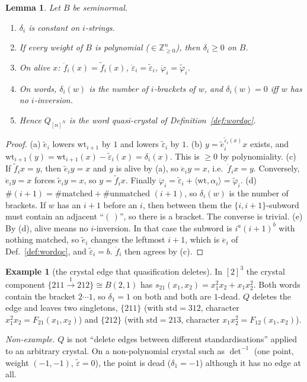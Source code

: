 \documentclass[11pt]{amsart}
\newtheorem{lemma}[theorem]{Lemma}
\theoremstyle{definition}
\newtheorem{example}[theorem]{Example}
\theoremstyle{remark}
\newcommand{\ee}{\ddot e}
\newcommand{\ff}{\ddot f}
\newcommand{\eps}{\ddot\varepsilon}
\newcommand{\vphi}{\ddot\varphi}
\newcommand{\te}{\tilde e}
\newcommand{\tf}{\tilde f}
\newcommand{\teps}{\tilde\varepsilon}
\newcommand{\tphi}{\tilde\varphi}
\newcommand{\wt}{\mathrm{wt}}
\newcommand{\std}{\mathrm{std}}
\begin{document}
\begin{lemma}\label{lem:defect}
Let $B$ be seminormal.
\begin{enumerate}[label=(\alph*)]
\item $\delta_i$ is constant on $i$-strings.
\item If every weight of $B$ is polynomial ($\in\mathbb Z_{\ge0}^n$), then $\delta_i\ge0$ on $B$.
\item On alive $x$: $\ff_i(x)=\tf_i(x)$, $\eps_i=\teps_i$, $\vphi_i=\tphi_i$.
\item On words, $\delta_i(w)$ is the number of $i$-brackets of $w$, and $\delta_i(w)=0$ iff $w$ has no $i$-inversion.
\item Hence $Q_{[n]^N}$ is the word quasi-crystal of Definition~\ref{def:wordqc}.
\end{enumerate}
\end{lemma}
\begin{proof}
(a) $\te_i$ lowers $\wt_{i+1}$ by $1$ and lowers $\teps_i$ by $1$.
(b) $y=\te_i^{\teps_i(x)}x$ exists, and $\wt_{i+1}(y)=\wt_{i+1}(x)-\teps_i(x)=\delta_i(x)$. This is $\ge0$ by polynomiality.
(c) If $\tf_ix=y$, then $\te_iy=x$ and $y$ is alive by (a), so $\ee_iy=x$, i.e.\ $\ff_ix=y$. Conversely, $\ee_iy=x$ forces $\te_iy=x$, so $y=\tf_ix$. Finally $\vphi_i=\teps_i+\langle\wt,\alpha_i\rangle=\tphi_i$.
(d) $\#(i+1)=\#\text{matched}+\#\text{unmatched }(i+1)$, so $\delta_i(w)$ is the number of brackets. If $w$ has an $i+1$ before an $i$, then between them the $\{i,i+1\}$-subword must contain an adjacent ``$(\,)$'', so there is a bracket. The converse is trivial.
(e) By (d), alive means no $i$-inversion. In that case the subword is $i^a(i+1)^b$ with nothing matched, so $\te_i$ changes the leftmost $i+1$, which is $\ee_i$ of Def.~\ref{def:wordqc}, and $\teps_i=b$. $\ff_i$ then agrees by (c).
\end{proof}

\begin{example}[the crystal edge that quasification deletes]\label{ex:211}
In $[2]^3$ the crystal component $\{211\xrightarrow{1}212\}\cong B(2,1)$ has $s_{21}(x_1,x_2)=x_1^2x_2+x_1x_2^2$. Both words contain the bracket $2\cdots1$, so $\delta_1=1$ on both and both are $1$-dead. $Q$ deletes the edge and leaves two singletons, $\{211\}$ (with $\std=312$, character $x_1^2x_2=F_{21}(x_1,x_2)$) and $\{212\}$ (with $\std=213$, character $x_1x_2^2=F_{12}(x_1,x_2)$).
\begin{center}
\end{center}
\emph{Non-example.} $Q$ is not ``delete edges between different standardisations'' applied to an arbitrary crystal. On a non-polynomial crystal such as $\det^{-1}$ (one point, weight $(-1,-1)$, $\teps=0$), the point is dead ($\delta_1=-1$) although it has no edge at all.
\end{example}
\end{document}
